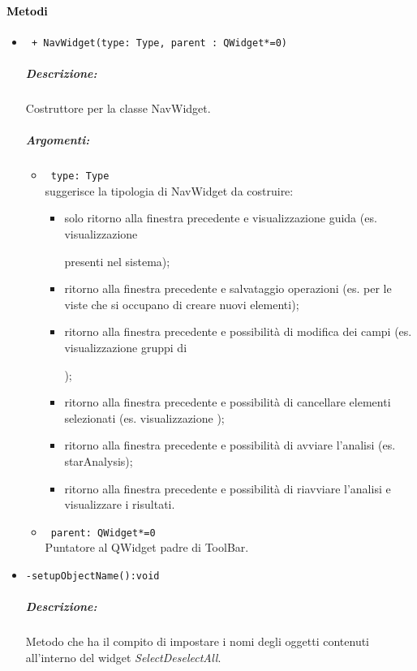 \paragraph{\textcolor{black}{Metodi\\}}
\begin{itemize}
\item \color{blue}\verb! + NavWidget(type: Type, parent : QWidget*=0)!
\color{black}
\subparagraph{Descrizione: }
Costruttore per la classe NavWidget. 
\subparagraph{Argomenti:}
\begin{itemize}
\item \color{RoyalPurple} \verb! type: Type !\\ suggerisce la tipologia di NavWidget da costruire:
\begin{itemize}
\item solo ritorno alla finestra precedente e visualizzazione guida (es. visualizzazione \subject{} presenti nel sistema);
\item ritorno alla finestra precedente e salvataggio operazioni (es. per le viste che si occupano di creare nuovi elementi);
\item ritorno alla finestra precedente e possibilità di modifica dei campi (es. visualizzazione gruppi di \subject{});
\item ritorno alla finestra precedente e possibilità di cancellare elementi selezionati (es. visualizzazione \protocol{});
\item ritorno alla finestra precedente e possibilità di avviare l'analisi (es. starAnalysis);
\item ritorno alla finestra precedente e possibilità di riavviare l'analisi e visualizzare i risultati.
\end{itemize}
\item  \color{RoyalPurple} \verb! parent: QWidget*=0 ! \\ Puntatore al QWidget padre di ToolBar.
\end{itemize}

\item \color{blue}\verb!-setupObjectName():void!
\color{black}
\subparagraph{Descrizione:} Metodo che ha il compito di impostare i nomi degli oggetti contenuti all'interno del widget \emph{SelectDeselectAll}.


\end{itemize}
